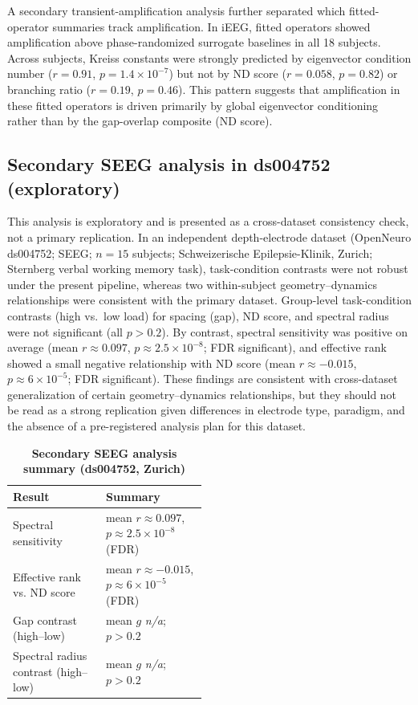 \documentclass[preprint,12pt,nonatbib]{elsarticle}
\begin{document}
A secondary transient-amplification analysis further separated which fitted-operator summaries track amplification. In iEEG, fitted operators showed amplification above phase-randomized surrogate baselines in all 18 subjects. Across subjects, Kreiss constants were strongly predicted by eigenvector condition number ($r=0.91$, $p=1.4\times10^{-7}$) but not by ND score ($r=0.058$, $p=0.82$) or branching ratio ($r=0.19$, $p=0.46$). This pattern suggests that amplification in these fitted operators is driven primarily by global eigenvector conditioning rather than by the gap-overlap composite (ND score).

\subsection{Secondary SEEG analysis in ds004752 (exploratory)}
This analysis is exploratory and is presented as a cross-dataset consistency check, not a primary replication. In an independent depth-electrode dataset (OpenNeuro ds004752; SEEG; $n=15$ subjects; Schweizerische Epilepsie-Klinik, Zurich; Sternberg verbal working memory task), task-condition contrasts were not robust under the present pipeline, whereas two within-subject geometry--dynamics relationships were consistent with the primary dataset. Group-level task-condition contrasts (high vs.\ low load) for spacing (gap), ND score, and spectral radius were not significant (all $p>0.2$). By contrast, spectral sensitivity was positive on average (mean $r\approx0.097$, $p\approx2.5\times10^{-8}$; FDR significant), and effective rank showed a small negative relationship with ND score (mean $r\approx-0.015$, $p\approx6\times10^{-5}$; FDR significant). These findings are consistent with cross-dataset generalization of certain geometry--dynamics relationships, but they should not be read as a strong replication given differences in electrode type, paradigm, and the absence of a pre-registered analysis plan for this dataset.

\begin{table}[t]
\centering
\begin{threeparttable}
\caption{\textbf{Secondary SEEG analysis summary (ds004752, Zurich)}}
\label{tab:replication_ds004752}
\renewcommand{\arraystretch}{1.1}
\setlength{\tabcolsep}{3pt}
\scriptsize
\begin{tabular}{@{}p{0.48\linewidth} l@{}}
\toprule
{Result} & {Summary} \\
\midrule
Spectral sensitivity & mean $r\approx0.097$, $p\approx2.5\times10^{-8}$ (FDR) \\
Effective rank vs. ND score & mean $r\approx-0.015$, $p\approx6\times10^{-5}$ (FDR) \\
Gap contrast (high--low) & mean $g$ \textit{n/a}; $p>0.2$ \\
Spectral radius contrast (high--low) & mean $g$ \textit{n/a}; $p>0.2$ \\
\bottomrule
\end{tabular}
\normalsize
\end{threeparttable}
\end{table}
\end{document}
